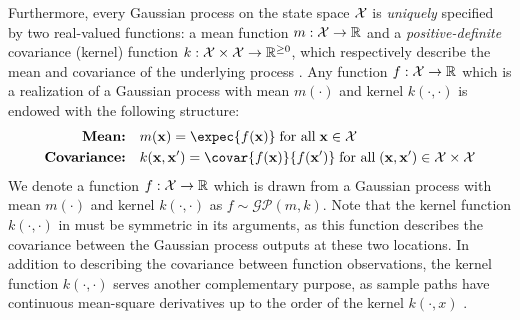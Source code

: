 \documentclass[10pt]{article}
\numberwithin{equation}{section}
\newcommand{\calGP}{\mathcal{GP}}
\begin{document}
Furthermore, every Gaussian process on the state space $\mathcal{X}$ is \emph{uniquely} specified by two real-valued functions: a mean function $m: \mathcal{X} \to \mathbb{R}$ and a \emph{positive-definite} covariance (kernel) function $k: \mathcal{X} \times \mathcal{X} \to \mathbb{R}^{\ge 0}$, which respectively describe the mean and covariance of the underlying process \citep{GPML-Book-2006}. Any function $f: \mathcal{X} \to \mathbb{R}$ which is a realization of a Gaussian process with mean $m(\cdot)$ and kernel $k(\cdot, \cdot)$ is endowed with the following structure:
\begin{subequations}
    \label{eq:GP-prior}
    \begin{align}
        \textbf{Mean:} \quad & m(\bfx) = \expec{f(\bfx)}\; \textrm{for all}\; \bfx \in \calX\label{eq:GP-prior-mean}\\%
        \textbf{Covariance:} \quad & k(\bfx, \bfx') = \covar{f(\bfx)}{f(\bfx')}\; \textrm{for all}\;(\bfx, \bfx') \in \calX \times \calX\label{eq:GP-prior-kernel}
    \end{align}
\end{subequations}
We denote a function $f: \mathcal{X} \to \mathbb{R}$ which is drawn from a Gaussian process with mean $m(\cdot)$ and kernel $k(\cdot, \cdot)$ as $f \sim \calGP(m, k)$. Note that the kernel function $k(\cdot, \cdot)$ in  must be symmetric in its arguments, as this function describes the covariance between the Gaussian process outputs at these two locations. In addition to describing the covariance between function observations, the kernel function $k(\cdot, \cdot)$ serves another complementary purpose, as sample paths have continuous mean-square derivatives up to the order of the kernel $k(\cdot, x)$ \citep{GPML-Book-2006}.
\end{document}
